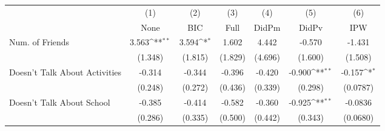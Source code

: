 {
\def\sym#1{\ifmmode^{#1}\else\(^{#1}\)\fi}
\begin{tabular}{l*{6}{c}}
\toprule
            &\multicolumn{1}{c}{(1)}&\multicolumn{1}{c}{(2)}&\multicolumn{1}{c}{(3)}&\multicolumn{1}{c}{(4)}&\multicolumn{1}{c}{(5)}&\multicolumn{1}{c}{(6)}\\
            &\multicolumn{1}{c}{None}&\multicolumn{1}{c}{BIC}&\multicolumn{1}{c}{Full}&\multicolumn{1}{c}{DidPm}&\multicolumn{1}{c}{DidPv}&\multicolumn{1}{c}{IPW}\\
\midrule
Num. of Friends&       3.563\sym{**} &       3.594\sym{*}  &       1.602         &       4.442         &      -0.570         &      -1.431         \\
            &     (1.348)         &     (1.815)         &     (1.829)         &     (4.696)         &     (1.600)         &     (1.508)         \\
\addlinespace
Doesn't Talk About Activities&      -0.314         &      -0.344         &      -0.396         &      -0.420         &      -0.900\sym{**} &      -0.157\sym{*}  \\
            &     (0.248)         &     (0.272)         &     (0.436)         &     (0.339)         &     (0.298)         &    (0.0787)         \\
\addlinespace
Doesn't Talk About School&      -0.385         &      -0.414         &      -0.582         &      -0.360         &      -0.925\sym{**} &     -0.0836         \\
            &     (0.286)         &     (0.335)         &     (0.500)         &     (0.442)         &     (0.343)         &    (0.0680)         \\
\bottomrule
\end{tabular}
}
